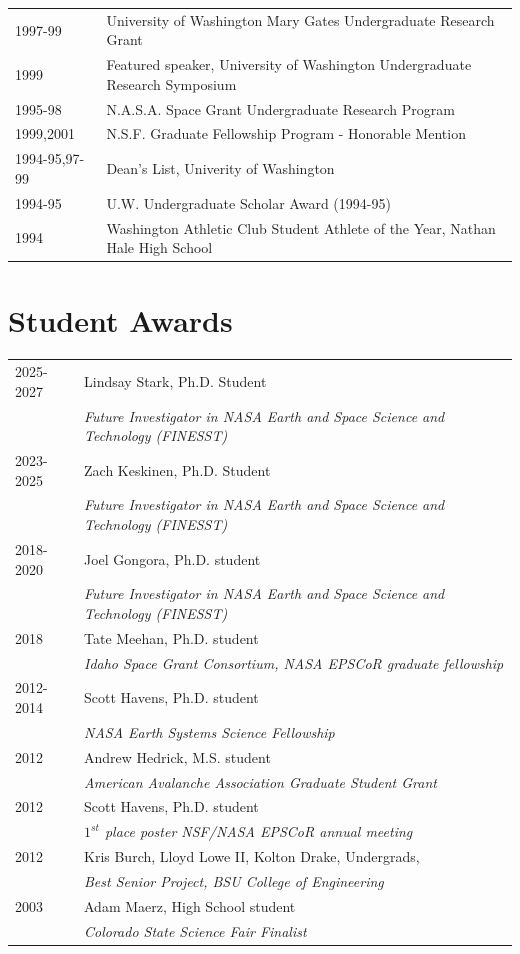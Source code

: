 \documentclass[11pt]{article}
\begin{document}
\begin{tabular}{ll}
1997-99 & University of Washington Mary Gates Undergraduate Research Grant \\
1999 & Featured speaker, University of Washington Undergraduate Research Symposium \\
1995-98 & N.A.S.A. Space Grant Undergraduate Research Program \\
1999,2001 & N.S.F. Graduate Fellowship Program - Honorable Mention \\
1994-95,97-99 & Dean's List, Univerity of Washington \\
1994-95 & U.W. Undergraduate Scholar Award (1994-95) \\
1994 & Washington Athletic Club Student Athlete of the Year, Nathan Hale High School \\
\end{tabular}

\section*{Student Awards}
\begin{tabular}{ll}
2025-2027 & Lindsay Stark, Ph.D. Student \\
& \textit{Future Investigator in NASA Earth and Space Science and Technology (FINESST)} \\
2023-2025 & Zach Keskinen, Ph.D. Student \\ 
& \textit{Future Investigator in NASA Earth and Space Science and Technology (FINESST)} \\
2018-2020 & Joel Gongora, Ph.D. student \\
& \textit{Future Investigator in NASA Earth and Space Science and Technology (FINESST)} \\
2018 & Tate Meehan, Ph.D. student \\
& \textit{Idaho Space Grant Consortium, NASA EPSCoR graduate fellowship} \\
2012-2014 & Scott Havens, Ph.D. student \\
& \textit{NASA Earth Systems Science Fellowship} \\
2012 & Andrew Hedrick, M.S. student \\
& \textit{American Avalanche Association Graduate Student Grant} \\
2012 & Scott Havens, Ph.D. student \\
& \textit{$1^{st}$ place poster NSF/NASA EPSCoR annual meeting} \\
2012 & Kris Burch, Lloyd Lowe II, Kolton Drake, Undergrads, \\ 
& \textit{Best Senior Project, BSU College of Engineering} \\
2003 & Adam Maerz, High School student \\
& \textit{Colorado State Science Fair Finalist}
\end{tabular}
\end{document}
